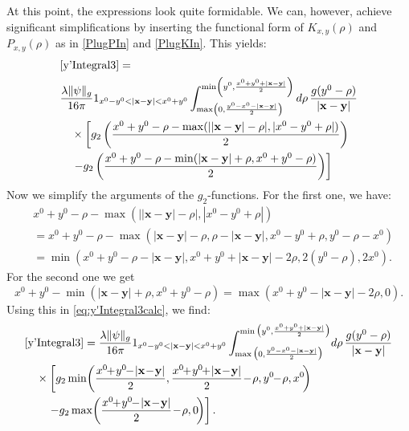 \documentclass[b5paper,draft,openbib,12pt]{memoir}
\newcommand{\vx}{\mathbf{x}}
\newcommand{\vy}{\mathbf{y}}
\begin{document}
At this point, the expressions look quite formidable. 
We can, however, achieve significant simplifications 
by inserting the functional form of $K_{x,y}(\rho)$ 
and $P_{x,y}(\rho)$ as in \eqref{PlugPIn} and 
\eqref{PlugKIn}. This yields:
\begin{align}
  &\eqref{y'Integral3} =\notag\\
  &\frac{\lambda\|\psi\|_g}{16\pi} 1_{x^0-y^0<|\vx-\vy|<x^0+y^0}
  \int_{\max\left(0,\frac{y^0-x^0-|\vx-\vy|}{2}\right)}^{\min\left(y^0,\frac{x^0+y^0+|\vx-\vy|}{2} \right)}d\rho \, \frac{g(y^0-\rho)}{|\vx-\vy|}\nonumber\\ 
  &~~~\times\left[ g_2\left( \frac{x^0+y^0-\rho-\max(||\vx-\vy|-\rho|,|x^0-y^0+\rho|)}{2} \right)\right.\nonumber\\
  &~~~\left.-g_2\left( \frac{x^0+y^0-\rho-\min(|\vx-\vy|+\rho,x^0+y^0-\rho)}{2} \right)\right]
	\label{eq:y'Integral3calc}
\end{align}
Now we simplify the arguments of the $g_2$-functions. 
For the first one, we have:
\begin{align}
&x^0\!\!+\!y^0\!\!-\!\rho\!-\!\max(||\vx\!-\!\vy|\!-\!\rho|,|x^0\!\!-\!y^0\!\!+\!\rho|)\nonumber\\
&= x^0\!\!+\!y^0\!\!-\!\rho\! -\!\max ( |\vx\!-\!\vy|\!-\!\rho,\rho\!-\!|\vx\!-\!\vy|,x^0\!\!-\!y^0\!\!+\!\rho,y^0\!\!-\!\rho\!-\!x^0)\nonumber\\
&= \min\!\left(x^0\!\!+\!y^0\!\!-\!\rho\!-\!|\vx\!-\!\vy|,x^0\!\!+\!y^0\!\!+\!|\vx\!-\!\vy|\!-\!2\rho,2(y^0\!\!-\!\rho),2x^0 \right).
\end{align}
For the second one we get
\begin{equation}
	x^0\!\!+\!y^0\!\!-\!\min(|\vx\!-\!\vy|\!+\!\rho,x^0\!\!+\!y^0\!\!-\!\rho) = \max(x^0\!\!+\!y^0\!\!-\!|\vx\!-\!\vy|\!-\!2\rho,0).
\end{equation}
Using this in \eqref{eq:y'Integral3calc}, we find:
\begin{align}
    &\eqref{y'Integral3} =\frac{\lambda\|\psi\|_g}{16\pi} 
    1_{x^0-y^0<|\vx-\vy|<x^0+y^0}
    \int_{\max\big(0,\frac{y^0-x^0-|\vx-\vy|}{2}\big)}^{\min\big(y^0,\frac{x^0+y^0+|\vx-\vy|}{2} \big)}\!d\rho \, \frac{g(y^0-\rho)}{|\vx-\vy|}\nonumber\\
    &\quad\times \left[g_2 \min\!\left(\frac{x^0\!\!+\!y^0\!\!-\!|\vx\!-\!\vy|}{2},\frac{x^0\!\!+\!y^0\!\!+\!|\vx\!-\!\vy|}{2}\!-\!\rho,y^0\!\!-\!\rho,x^0 \!\right) \right.\nonumber\\
    &\quad \quad \left. -g_2 \max\!\left( \frac{x^0\!\!+\!y^0\!\!-\!|\vx\!-\!\vy|}{2}\!-\!\rho,0\!\right) \right].
\end{align}
\end{document}

